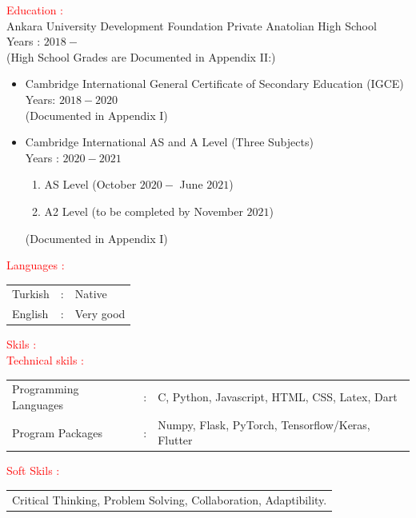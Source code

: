 \documentclass[a4paper]{article}
\begin{document}
\vskip 0.5cm
\textcolor{red}{\huge Education :\hfill}\\
\vskip 0.3cm
Ankara University Development Foundation Private Anatolian High School\\
Years : $2018 -$\\
(High School Grades are Documented in Appendix II:)
\begin{itemize}
\item {Cambridge International General Certificate of Secondary Education (IGCE)\\
Years:  $2018-2020$} \\
(Documented in Appendix I)
\item Cambridge International AS and A Level  (Three Subjects) \\
 Years : $2020-2021$\\
\begin{enumerate}
\item AS Level (October $2020 -$ June $2021$)
\item A2 Level (to be completed by November $2021$)
\end{enumerate}
(Documented in Appendix I)
\end{itemize}

\vskip 0.5cm
\textcolor{red}{\huge Languages :\hfill}\\
\vskip 0.3cm
\begin{tabular}{lcl}
  Turkish &:& Native\\
  English &:& Very good
\end{tabular}
\vskip 0.5cm
\textcolor{red}{\huge Skils    : \hfill }\\
\vskip 0.2cm
\textcolor{red}{\large Technical skils :}\\
\vskip 0.1cm
\begin{tabular}{lcl}
Programming Languages    &:& C, Python, Javascript, HTML, CSS, Latex, Dart\\
Program Packages         &:& Numpy, Flask, PyTorch, Tensorflow/Keras, Flutter
\end{tabular}
\vskip 0.2cm
\textcolor{red}{\large Soft Skils      :}\\
\vskip 0.1cm
\begin{tabular}{l}
  Critical Thinking, Problem Solving, Collaboration, Adaptibility.
\end{tabular}
\end{document}

